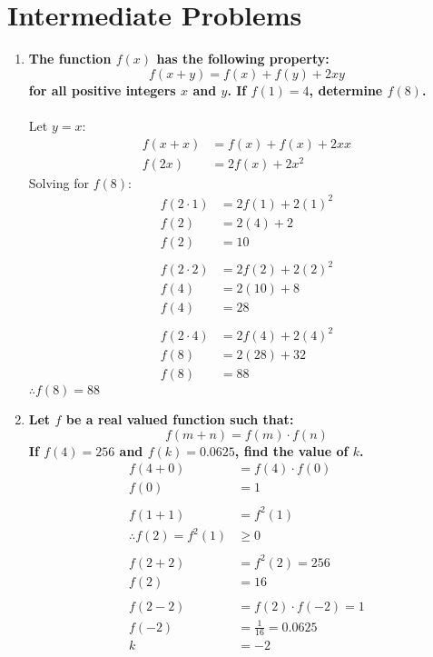 \documentclass[12pt]{article}
\begin{document}
\section*{Intermediate Problems}
\begin{enumerate}
    \item \textbf{The function $f(x)$ has the following property: $$f(x+y)=f(x)+f(y)+2xy$$ for all positive integers $x$ and $y$. If $f(1)=4$, determine $f(8)$.} \\ \\
    Let $y = x$:
    \begin{align*}
        f(x + x) &= f(x) + f(x) + 2xx \\
        f(2x) &= 2f(x) + 2x^2
    \end{align*}
    Solving for $f(8)$:
    \begin{align*}
        f(2 \cdot 1) &= 2f(1) + 2(1)^2 \\
        f(2) &= 2(4) + 2 \\
        f(2) & = 10 \\ \\
        f(2 \cdot 2) &= 2f(2) + 2(2)^2 \\
        f(4) &= 2(10) + 8 \\
        f(4) & = 28 \\ \\
        f(2 \cdot 4) &= 2f(4) + 2(4)^2 \\
        f(8) &= 2(28) + 32 \\
        f(8) & = 88
    \end{align*}
    $\therefore f(8) = 88$

    \item \textbf{Let $f$ be a real valued function such that: $$f(m + n) = f(m)\cdot f(n)$$ If $f(4) = 256$ and $f(k) = 0.0625$, find the value of $k$.}
    \begin{align*}
        f(4+0)&=f(4)\cdot f(0) \\
        f(0)&=1 \\ \\
        f(1+1)&=f^2(1) \\
        \therefore f(2) = f^2(1) & \geq 0 \\ \\
        f(2+2)&=f^2(2)=256 \\
        f(2)&=16 \\ \\
        f(2-2)&=f(2)\cdot f(-2)=1 \\
        f(-2)&=\frac{1}{16}=0.0625 \\
        k&=-2
    \end{align*}
    
\end{enumerate}
\end{document}
